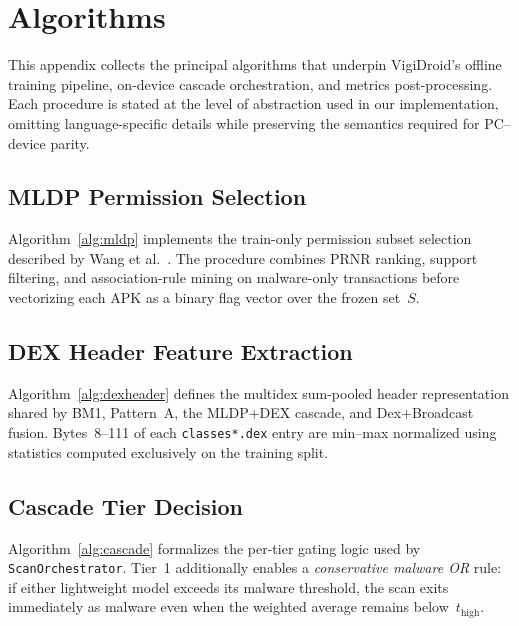 \chapter{Algorithms}\label{ch:algorithms}

This appendix collects the principal algorithms that underpin VigiDroid's offline training pipeline, on-device cascade orchestration, and metrics post-processing. Each procedure is stated at the level of abstraction used in our implementation, omitting language-specific details while preserving the semantics required for PC--device parity.

\section{MLDP Permission Selection}
Algorithm~\ref{alg:mldp} implements the train-only permission subset selection described by Wang et al.~\cite{mldp}. The procedure combines PRNR ranking, support filtering, and association-rule mining on malware-only transactions before vectorizing each APK as a binary flag vector over the frozen set~$S$.

\begin{algorithm}
  \caption{MLDP permission subset selection (train split only)}
  \label{alg:mldp}
  \begin{algorithmic}
    
  \end{algorithmic}
\end{algorithm}

\section{DEX Header Feature Extraction}
Algorithm~\ref{alg:dexheader} defines the multidex sum-pooled header representation shared by BM1, Pattern~A, the MLDP+DEX cascade, and Dex+Broadcast fusion. Bytes~8--111 of each \texttt{classes*.dex} entry are min--max normalized using statistics computed exclusively on the training split.

\begin{algorithm}
  \caption{Multidex DEX header feature extraction}
  \label{alg:dexheader}
  \begin{algorithmic}
    
  \end{algorithmic}
\end{algorithm}

\section{Cascade Tier Decision}
Algorithm~\ref{alg:cascade} formalizes the per-tier gating logic used by \texttt{ScanOrchestrator}. Tier~1 additionally enables a \emph{conservative malware OR} rule: if either lightweight model exceeds its malware threshold, the scan exits immediately as malware even when the weighted average remains below~$t_{\mathrm{high}}$.

